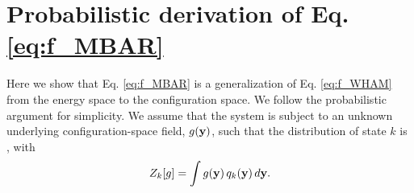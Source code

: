 \documentclass[reprint,aip,jcp,superscriptaddress]{revtex4-1}
\begin{document}
\appendix





\section{\label{sec:deriveMBAR}
Probabilistic derivation of Eq. \eqref{eq:f_MBAR}}



Here we show that
Eq. \eqref{eq:f_MBAR}
is a generalization of Eq. \eqref{eq:f_WHAM}
from the energy space to the configuration space.
%
We follow the probabilistic argument\cite{
bartels1997, *gallicchio2005, *habeck2007, *habeck2012, zhu2012}
for simplicity.
%
We assume that the system is subject to
an unknown underlying configuration-space field, $g(\mathbf{y})$,
such that the distribution of state $k$ is
, with
%
\begin{equation}
Z_k[g]
=
\int g(\mathbf{y}) \, q_k(\mathbf{y}) \, d\mathbf{y}.
\label{eq:Zg}
\end{equation}
\end{document}

